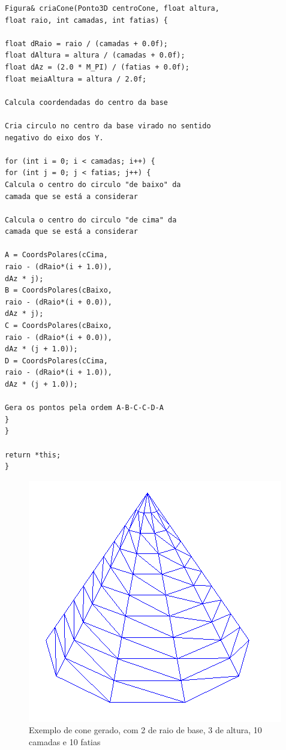 \begin{Verbatim}
Figura& criaCone(Ponto3D centroCone, float altura, 
float raio, int camadas, int fatias) {

float dRaio = raio / (camadas + 0.0f);
float dAltura = altura / (camadas + 0.0f);
float dAz = (2.0 * M_PI) / (fatias + 0.0f);
float meiaAltura = altura / 2.0f;

Calcula coordendadas do centro da base

Cria circulo no centro da base virado no sentido
negativo do eixo dos Y.

for (int i = 0; i < camadas; i++) {
for (int j = 0; j < fatias; j++) {
Calcula o centro do circulo "de baixo" da
camada que se está a considerar

Calcula o centro do circulo "de cima" da
camada que se está a considerar

A = CoordsPolares(cCima,
raio - (dRaio*(i + 1.0)),
dAz * j);
B = CoordsPolares(cBaixo,
raio - (dRaio*(i + 0.0)),
dAz * j);
C = CoordsPolares(cBaixo,
raio - (dRaio*(i + 0.0)),
dAz * (j + 1.0));
D = CoordsPolares(cCima,
raio - (dRaio*(i + 1.0)),
dAz * (j + 1.0));

Gera os pontos pela ordem A-B-C-C-D-A
}
}

return *this;
}
\end{Verbatim}

\begin{figure}[<+htpb+>]
	\centering
	\includegraphics[scale=0.5]{imagens/p3_cone_2_3_10_10.png}
	\caption{Exemplo de cone gerado, com 2 de raio de base, 3 de altura, 10 camadas e 10 fatias}
	\label{p1:fig:p3_cone_2_3_10_10}
\end{figure}


